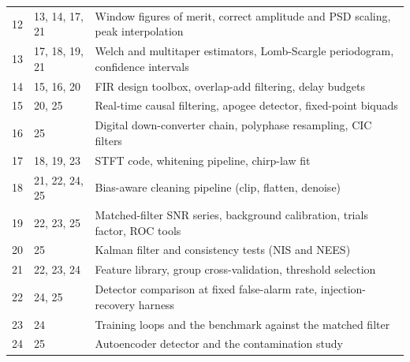 \documentclass[11pt,a4paper,landscape]{article}
\begin{document}
{\begin{longtable}{@{}p{1.6cm}p{3.6cm}p{17cm}@{}}
12 & 13, 14, 17, 21 & Window figures of merit, correct amplitude and PSD scaling, peak interpolation\\
13 & 17, 18, 19, 21 & Welch and multitaper estimators, Lomb-Scargle periodogram, confidence intervals\\
14 & 15, 16, 20 & FIR design toolbox, overlap-add filtering, delay budgets\\
15 & 20, 25 & Real-time causal filtering, apogee detector, fixed-point biquads\\
16 & 25 & Digital down-converter chain, polyphase resampling, CIC filters\\
17 & 18, 19, 23 & STFT code, whitening pipeline, chirp-law fit\\
18 & 21, 22, 24, 25 & Bias-aware cleaning pipeline (clip, flatten, denoise)\\
19 & 22, 23, 25 & Matched-filter SNR series, background calibration, trials factor, ROC tools\\
20 & 25 & Kalman filter and consistency tests (NIS and NEES)\\
21 & 22, 23, 24 & Feature library, group cross-validation, threshold selection\\
22 & 24, 25 & Detector comparison at fixed false-alarm rate, injection-recovery harness\\
23 & 24 & Training loops and the benchmark against the matched filter\\
24 & 25 & Autoencoder detector and the contamination study\\
\bottomrule\end{longtable}}
\end{document}
